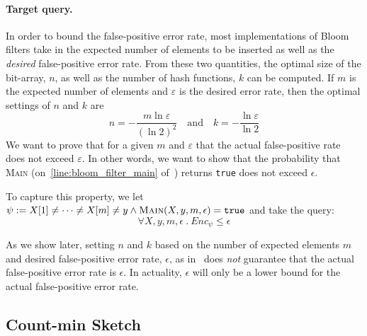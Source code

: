 \documentclass[acmsmall,review,anonymous]{acmart}\settopmatter{printfolios=true,printccs=false,printacmref=false}
\begin{document}
\paragraph*{Target query.}
In order to bound the false-positive error rate, most implementations of Bloom filters take in the expected number of elements to be inserted as well as the \textit{desired} false-positive error rate.
% 
From these two quantities, the optimal size of the bit-array, $n$, as well as the number of hash functions, $k$ can be computed.
% 
If $m$ is the expected number of elements and $\varepsilon$ is the desired error rate, then the optimal settings of $n$ and $k$ are
\begin{equation}
  n = - \frac{m\ln \varepsilon}{(\ln 2)^2}\quad\text{and}\quad k = - \frac{\ln \varepsilon}{\ln 2}\label{eq:bloom_n_and_k}
\end{equation}
% 
We want to prove that for a given $m$ and $\varepsilon$ that the actual false-positive rate does not exceed $\varepsilon$.
% 
In other words, we want to show that the probability that \textsc{Main} (on~\cref{line:bloom_filter_main} of~) returns \texttt{true} does not exceed $\epsilon$.

To capture this property, we let $\psi := X[1] \neq \cdots \neq X[m] \neq y \wedge \textsc{Main}(X,y,m,\epsilon) = \texttt{true}$ and take the query:
% 
\begin{equation*}
  \forall X,y,m,\epsilon~.~Enc_\psi \leq \epsilon
\end{equation*}

As we show later, setting $n$ and $k$ based on the number of expected elements $m$ and desired false-positive error rate, $\epsilon$, as in~ does \textit{not} guarantee that the actual false-positive error rate is $\epsilon$.
% 
In actuality, $\epsilon$ will only be a lower bound for the actual false-positive error rate.

\subsection{Count-min Sketch}
\label{sec:countminsketch}
\end{document}
